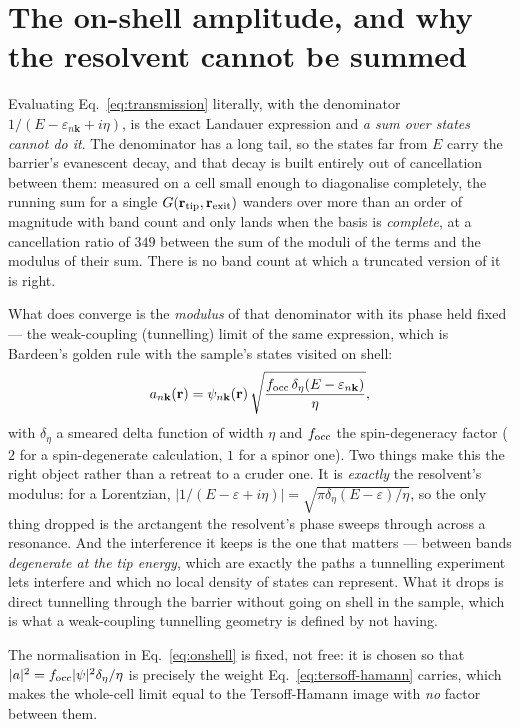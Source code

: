 \documentclass[11pt]{article}
\begin{document}
\section{The on-shell amplitude, and why the resolvent cannot be summed}
\label{sec:onshell}

Evaluating Eq.~\eqref{eq:transmission} literally, with the denominator
$1/(E-\varepsilon_{n\mathbf k}+i\eta)$, is the exact Landauer expression and
\emph{a sum over states cannot do it}. The denominator has a long tail, so the
states far from $E$ carry the barrier's evanescent decay, and that decay is
built entirely out of cancellation between them: measured on a cell small
enough to diagonalise completely, the running sum for a single
$G(\mathbf r_{\rm tip},\mathbf r_{\rm exit})$ wanders over more than an order
of magnitude with band count and only lands when the basis is \emph{complete},
at a cancellation ratio of $349$ between the sum of the moduli of the terms
and the modulus of their sum. There is no band count at which a truncated
version of it is right.

What does converge is the \emph{modulus} of that denominator with its phase
held fixed --- the weak-coupling (tunnelling) limit of the same expression,
which is Bardeen's golden rule with the sample's states visited on shell:
\begin{equation}
  a_{n\mathbf k}(\mathbf r)=\psi_{n\mathbf k}(\mathbf r)\,
    \sqrt{\frac{f_{\rm occ}\,\delta_\eta(E-\varepsilon_{n\mathbf k})}{\eta}},
  \label{eq:onshell}
\end{equation}
with $\delta_\eta$ a smeared delta function of width $\eta$ and $f_{\rm occ}$
the spin-degeneracy factor ($2$ for a spin-degenerate calculation, $1$ for a
spinor one). Two things make this the right object rather than a retreat to a
cruder one. It is \emph{exactly} the resolvent's modulus: for a Lorentzian,
$|1/(E-\varepsilon+i\eta)|=\sqrt{\pi\delta_\eta(E-\varepsilon)/\eta}$, so the
only thing dropped is the arctangent the resolvent's phase sweeps through
across a resonance. And the interference it keeps is the one that matters ---
between bands \emph{degenerate at the tip energy}, which are exactly the paths
a tunnelling experiment lets interfere and which no local density of states
can represent. What it drops is direct tunnelling through the barrier without
going on shell in the sample, which is what a weak-coupling tunnelling
geometry is defined by not having.

The normalisation in Eq.~\eqref{eq:onshell} is fixed, not free: it is chosen so
that $|a|^2=f_{\rm occ}|\psi|^2\delta_\eta/\eta$ is precisely the weight
Eq.~\eqref{eq:tersoff-hamann} carries, which makes the whole-cell limit equal
to the Tersoff-Hamann image with \emph{no} factor between them.
\end{document}
